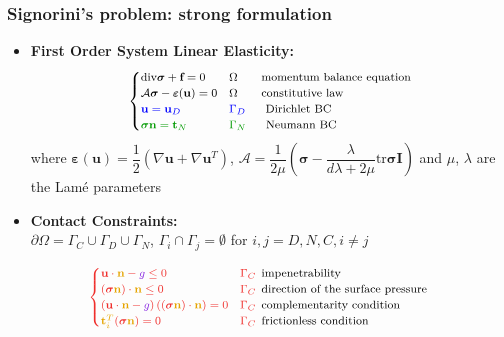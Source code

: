 \documentclass[8pt, oneside]{beamer}   	%
\newcommand{\bff}{\textbf{f}}
\newcommand{\bI}{\textbf{I}}
\newcommand{\bn}{\textbf{n}}
\newcommand{\bt}{\textbf{t}}
\newcommand{\bu}{\textbf{u}}
\newcommand{\bsigma}{\boldsymbol{\sigma}}
\newcommand{\eeee}{\'e}
\newcommand{\colb}{\color{blue}}
\newcommand{\colg}{\color{mygreen}}
\newcommand{\colo}{\color{orange}}
\newcommand{\colk}{\color{black}}
\newcommand{\colp}{\color{blueviolet}}
\newcommand{\colgold}{\color{gold}}
\newcommand{\titlecolor}[1]{\frametitle{\textcolor{dkgrey}{ \textbf{#1}}}}
\begin{document}
\begin{frame}
\titlecolor{Signorini's problem: strong formulation}

\begin{itemize}
\item  \textbf{First Order System Linear Elasticity:}
\begin{align*}
\colk
\footnotesize
\begin{cases}
\text{div} \bsigma + \bff=0 & \Omega  \qquad \colk{\text{momentum balance equation}}\\
\mathcal{A} \bsigma - \boldsymbol{\varepsilon}(\bu)=0 &\Omega \qquad \colk{\text{constitutive law}}\\
\colb \bu = \bu_D & \colb \Gamma_D\quad \:\:\: \colk{{\text{Dirichlet BC}}}\\
\colg \bsigma  \bn = \bt_N & \colg \Gamma_N\quad  \:\:\:\colk{{\text{Neumann BC}}}\\
\end{cases} 
\end{align*}
\scriptsize
where  $\boldsymbol{\varepsilon}(\bu)= \dfrac{1}{2} (\nabla \bu+\nabla \bu^T)$, $\boldsymbol{\mathcal{A}}=\dfrac{1}{2 \mu} \left(\bsigma-\dfrac{\lambda}{d \lambda + 2 \mu } \text{tr} \bsigma \bI\right)$ and $\mu$, $\lambda$ are the Lam\eeee  ${}$ parameters
\normalsize
\item { \textbf{Contact Constraints:} }\\
\colk
\small
$ \partial \Omega=\Gamma_C \cup  \Gamma_D \cup  \Gamma_N$, $\Gamma_i \cap  \Gamma_j =\emptyset$ for $i,j=D,N,C, i \neq j$
\end{itemize}
\begin{align*}\colo
\footnotesize
\begin{cases}
\bu \cdot \colgold \bn \colo- \colp{g} \colo  \leq 0 \quad & \Gamma_C  \:\:  \colk{\text{impenetrability}}\\
(\bsigma \colgold \bn \colo) \cdot \colgold \bn \colo \leq 0 \quad & \Gamma_C  \:\:  \colk{\text{direction of the surface pressure}}\\
 \left(\bu \cdot\colgold \bn \colo -\colp{g} \colo \right) \left( (\bsigma\colgold \bn \colo) \cdot \colgold \bn \colo \right) =0 &\Gamma_C  \:\:  \colk{\text{complementarity condition}}\\
\colgold \bt_i^T \colo(\bsigma \colgold \bn \colo) =0  \quad & \Gamma_C  \:\: \colk{\text{frictionless condition}}
\end{cases}

\end{align*}
\end{frame}
\end{document}
